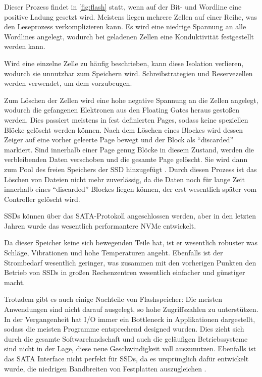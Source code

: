 Dieser Prozess findet in \autoref{fig:flash} statt, wenn auf der Bit- und Wordline eine positive Ladung gesetzt wird. Meistens liegen mehrere Zellen auf einer Reihe, was den Leseprozess verkomplizieren kann. Es wird eine niedrige Spannung an alle Wordlines angelegt, wodurch bei geladenen Zellen eine Konduktivität festgestellt werden kann. 

Wird eine einzelne Zelle zu häufig beschrieben, kann diese Isolation verlieren, wodurch sie unnutzbar zum Speichern wird. Schreibstrategien und Reservezellen werden verwendet, um dem vorzubeugen.	

Zum Löschen der Zellen wird eine hohe negative Spannung an die Zellen angelegt, wodurch die gefangenen Elektronen aus den Floating Gates heraus gestoßen werden. Dies passiert meistens in fest definierten Pages, sodass keine speziellen Blöcke gelöscht werden können. Nach dem Löschen eines Blockes wird dessen Zeiger auf eine vorher geleerte Page bewegt und der Block als ``discarded'' markiert. Sind innerhalb einer Page genug Blöcke in diesem Zustand, werden die verbleibenden Daten verschoben und die gesamte Page gelöscht. Sie wird dann zum Pool des freien Speichers der SSD hinzugefügt \parencite{kaufmann.2016}. 
Durch diesen Prozess ist das Löschen von Dateien nicht mehr zuverlässig, da die Daten noch für lange Zeit innerhalb eines ``discarded'' Blockes liegen können, der erst wesentlich später vom Controller gelöscht wird.

SSDs können über das SATA-Protokoll angeschlossen werden, aber in den letzten Jahren wurde das wesentlich performantere NVMe entwickelt.

Da dieser Speicher keine sich bewegenden Teile hat, ist er wesentlich robuster was Schläge, Vibrationen und hohe Temperaturen angeht. Ebenfalls ist der Strombedarf wesentlich geringer, was zusammen mit den vorherigen Punkten den Betrieb von SSDs in großen Rechenzentren wesentlich einfacher und günstiger macht.

Trotzdem gibt es auch einige Nachteile von Flashspeicher: Die meisten Anwendungen sind nicht darauf ausgelegt, so hohe Zugriffszahlen zu unterstützen. In der Vergangenheit hat I/O immer ein Bottleneck in Applikationen dargestellt, sodass die meisten Programme entsprechend designed wurden.
Dies zieht sich durch die gesamte Softwarelandschaft und auch die geläufigen Betriebssysteme sind nicht in der Lage, diese neue Geschwindigkeit voll auszunutzen. Ebenfalls ist das SATA Interface nicht perfekt für SSDs, da es ursprünglich dafür entwickelt wurde, die niedrigen Bandbreiten von Festplatten auszugleichen \parencite[Kap. 3]{kaufmann.2016}.


